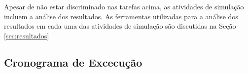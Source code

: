 

Apesar de não estar discriminado nas tarefas acima, as atividades de simulação incluem a análise dos resultados. 
As ferramentas utilizadas para a análise dos resultados em cada uma das atividades de simulação são discutidas na Seção \ref{sec:resultados}

\subsection{Cronograma de Excecução}

